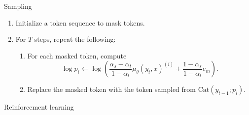 \documentclass[normaltitle,first=orange,second=red,leqno]{aaltoslides}
\newcommand{\thesiscolor}{orange}
\begin{document}

\begin{frame}{Sampling}
    \begin{enumerate}
        \item<1-> Initialize a token sequence to mask tokens.
        \item<2-> For $T$ steps, repeat the following:
        \begin{enumerate}
            \item For each masked token, compute
            \begin{equation*}
                \log p_i \leftarrow \log(\frac{\alpha_s - \alpha_t}{1 - \alpha_t}\mu_\theta(y_t, x)^{(i)} + \frac{1 - \alpha_s}{1 - \alpha_t}e_m).
            \end{equation*}
            \item Replace the masked token with the token sampled from $\text{Cat}(y_{t - 1}; p_i)$.
        \end{enumerate}
    \end{enumerate}
\end{frame}


\begin{frame}
\begin{center}
\Huge{\color{\thesiscolor} Reinforcement learning}
\end{center}
\end{frame}
\end{document}
